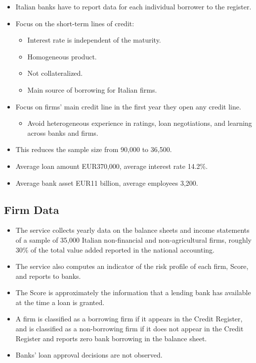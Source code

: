 \documentclass[
]{book}
\providecommand{\tightlist}{%
  \setlength{\itemsep}{0pt}\setlength{\parskip}{0pt}}
\begin{document}
\begin{itemize}
\tightlist
\item
  Italian banks have to report data for each individual borrower to the register.
\item
  Focus on the short-term lines of credit:

  \begin{itemize}
  \tightlist
  \item
    Interest rate is independent of the maturity.
  \item
    Homogeneous product.
  \item
    Not collateralized.
  \item
    Main source of borrowing for Italian firms.
  \end{itemize}
\item
  Focus on firms' main credit line in the first year they open any credit line.

  \begin{itemize}
  \tightlist
  \item
    Avoid heterogeneous experience in ratings, loan negotiations, and learning across banks and firms.
  \end{itemize}
\item
  This reduces the sample size from 90,000 to 36,500.
\item
  Average loan amount EUR370,000, average interest rate 14.2\%.
\item
  Average bank asset EUR11 billion, average employees 3,200.
\end{itemize}

\hypertarget{firm-data}{%
\subsection{Firm Data}\label{firm-data}}

\begin{itemize}
\tightlist
\item
  The service collects yearly data on the balance sheets and income statements of a sample of 35,000 Italian non-financial and non-agricultural firms, roughly 30\% of the total value added reported in the national accounting.
\item
  The service also computes an indicator of the risk profile of each firm, Score, and reports to banks.
\item
  The Score is approximately the information that a lending bank has available at the time a loan is granted.
\item
  A firm is classified as a borrowing firm if it appears in the Credit Register, and is classified as a non-borrowing firm if it does not appear in the Credit Register and reports zero bank borrowing in the balance sheet.
\item
  Banks' loan approval decisions are not observed.
\end{itemize}
\end{document}

